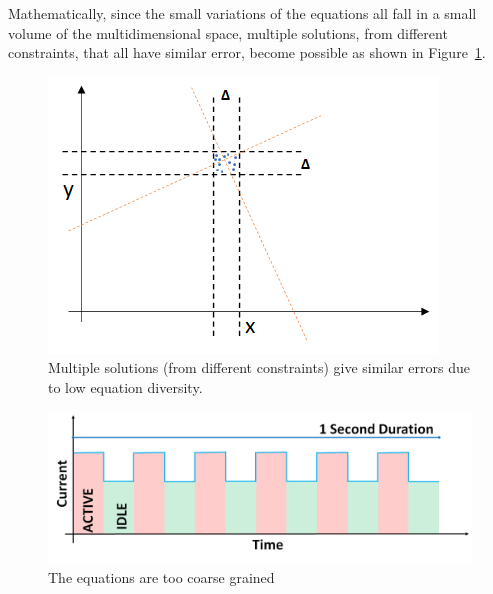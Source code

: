 Mathematically, since the small variations of the equations
all fall in a small volume of the multidimensional space, 
multiple solutions, from different constraints, 
that all have similar error, become possible as shown in Figure~\ref{fig:mutiple_equations}.

\begin{figure}[tp]
    \centering
    \includegraphics[width=0.70\columnwidth]{figures/mutiple_equations.png}
    \vspace{-0.1in}
    \caption{Multiple solutions (from different constraints) give similar errors due to low equation diversity.}
    \label{fig:mutiple_equations}
    \vspace{-0.1in}
\end{figure}
\fi



\begin{figure}[hp]
    \centering
    \includegraphics[width=0.95\columnwidth]{figures/coarse_grained_2.png}
    \vspace{-0.1in}
    \caption{The equations are too coarse grained}
    \label{fig:coarse_grained}
    \vspace{-0.1in}
\end{figure}
\fi

